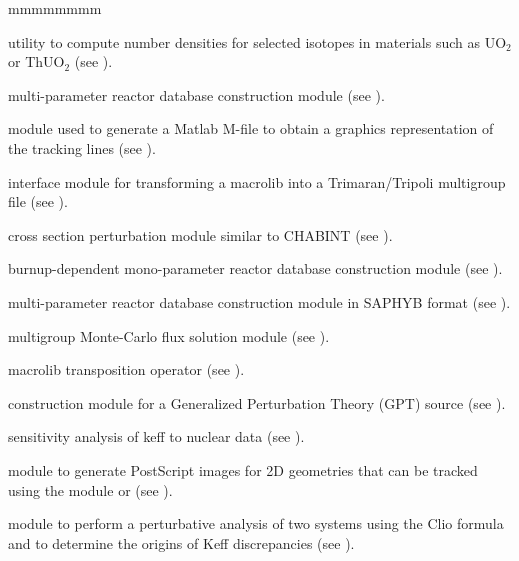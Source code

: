 \begin{ListeDeDescription}{mmmmmmmm}
\item[\moc{INFO:}] utility to compute number densities for selected isotopes in materials such as
UO$_{2}$ or ThUO$_{2}$ (see ).

\item[\moc{COMPO:}] multi-parameter reactor database construction module (see
).

\item[\moc{TLM:}] module used to generate a Matlab M-file to obtain a graphics representation of the  
tracking lines (see ).

\item[\moc{M2T:}] interface module for transforming a macrolib into a Trimaran/Tripoli multigroup file (see ).

\item[\moc{CHAB:}] cross section perturbation module similar to CHABINT (see ).

\item[\moc{CPO:}] burnup-dependent mono-parameter reactor database construction module (see
).

\item[\moc{SAP:}] multi-parameter reactor database construction module in SAPHYB format (see
).

\item[\moc{MC:}] multigroup Monte-Carlo flux solution module (see ).

\item[\moc{T:}] macrolib transposition operator (see ).

\item[\moc{DMAC:}] construction module for a Generalized Perturbation Theory (GPT) source (see ).

\item[\moc{SENS:}] sensitivity analysis of keff to nuclear data (see ).

\item[\moc{PSP:}] module to generate PostScript images for 2D geometries that can be tracked using the module 
 or  (see ).

\item[\moc{DUO:}] module to perform a perturbative analysis of two systems using the Clio formula and to determine the origins
of Keff discrepancies (see ).

\end{ListeDeDescription}
